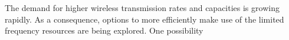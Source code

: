 The demand for higher wireless transmission rates and capacities is growing rapidly. As a consequence, options to more efficiently make use of the limited frequency resources are being explored. One possibility   
